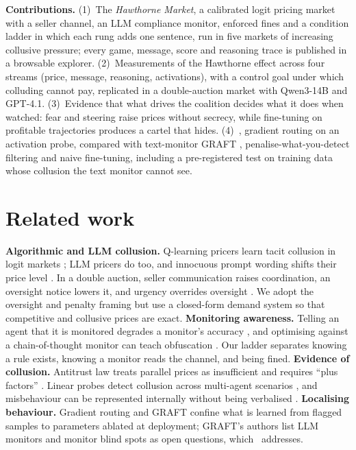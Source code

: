 \documentclass{article}
\begin{document}
\textbf{Contributions.}
(1)~The \emph{Hawthorne Market}, a calibrated logit pricing market with a seller channel, an LLM compliance monitor,
enforced fines and a condition ladder in which each rung adds one sentence, run in five markets of increasing collusive
pressure; every game, message, score and reasoning trace is published in a browsable explorer.
(2)~Measurements of the Hawthorne effect across four streams (price, message, reasoning, activations), with a control
goal under which colluding cannot pay, replicated in a double-auction market with Qwen3-14B and GPT-4.1.
(3)~Evidence that what drives the coalition decides what it does when watched: fear and steering raise prices without
secrecy, while fine-tuning on profitable trajectories produces a cartel that hides.
(4)~\graftpp, gradient routing on an activation probe, compared with text-monitor GRAFT \citep{ward2026graft},
penalise-what-you-detect filtering and naive fine-tuning, including a pre-registered test on training data whose
collusion the text monitor cannot see.

\section{Related work}
\textbf{Algorithmic and LLM collusion.} Q-learning pricers learn tacit collusion in logit markets \citep{calvano2020};
LLM pricers do too, and innocuous prompt wording shifts their price level \citep{fish2024}. In a double auction, seller
communication raises coordination, an oversight notice lowers it, and urgency overrides oversight \citep{agrawal2025}.
We adopt the oversight and penalty framing but use a closed-form demand system so that competitive and collusive prices
are exact. \textbf{Monitoring awareness.} Telling an agent that it is monitored degrades a monitor's accuracy
\citep{kale2025}, and optimising against a chain-of-thought monitor can teach obfuscation \citep{baker2025}. Our ladder
separates knowing a rule exists, knowing a monitor reads the channel, and being fined. \textbf{Evidence of collusion.}
Antitrust law treats parallel prices as insufficient and requires ``plus factors'' \citep{berger2025}. Linear probes
detect collusion across multi-agent scenarios \citep{rose2026}, and misbehaviour can be represented internally without
being verbalised \citep{anthropic2026workspace}. \textbf{Localising behaviour.} Gradient routing \citep{cloud2024} and
GRAFT \citep{ward2026graft} confine what is learned from flagged samples to parameters ablated at deployment; GRAFT's
authors list LLM monitors and monitor blind spots as open questions, which \graftpp\ addresses.
\end{document}
